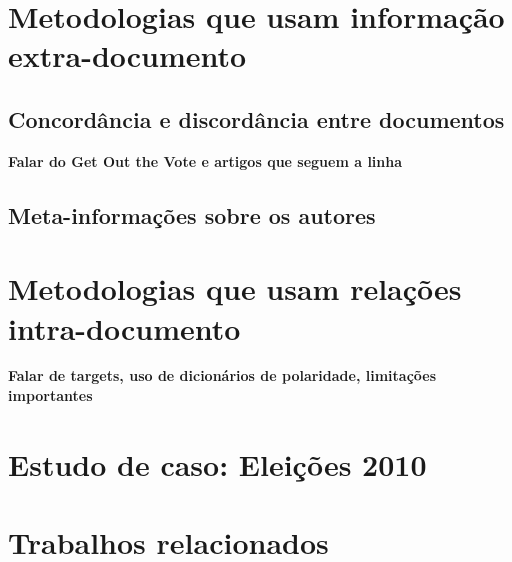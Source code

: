 
\chapter{Metodologias que usam informação extra-documento}

\section{Concordância e discordância entre documentos}
  \textbf{Falar do Get Out the Vote e artigos que seguem a linha}

\section{Meta-informações sobre os autores}

\chapter{Metodologias que usam relações intra-documento}

\textbf{Falar de targets, uso de dicionários de polaridade, limitações importantes}

\chapter{Estudo de caso: Eleições 2010}

\chapter{Trabalhos relacionados}
